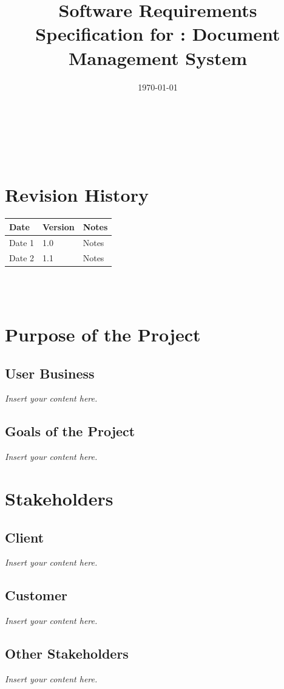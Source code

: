 \documentclass[12pt]{article}
\newcommand{\lips}{\textit{Insert your content here.}}
\begin{document}
\title{Software Requirements Specification for \progname: Document Management System} 
\author{\authname}
\date{\today}
	
\maketitle

~\newpage


\tableofcontents

~\newpage

\section*{Revision History}

\begin{tabularx}{\textwidth}{p{3cm}p{2cm}X}
\toprule {\textbf{Date}} & {\textbf{Version}} & {\textbf{Notes}}\\
\midrule
Date 1 & 1.0 & Notes\\
Date 2 & 1.1 & Notes\\
\bottomrule
\end{tabularx}

~\\

~\newpage
\section{Purpose of the Project}
\subsection{User Business}
\lips
\subsection{Goals of the Project}
\lips
\section{Stakeholders}
\subsection{Client}
\lips
\subsection{Customer}
\lips
\subsection{Other Stakeholders}
\lips
\end{document}
